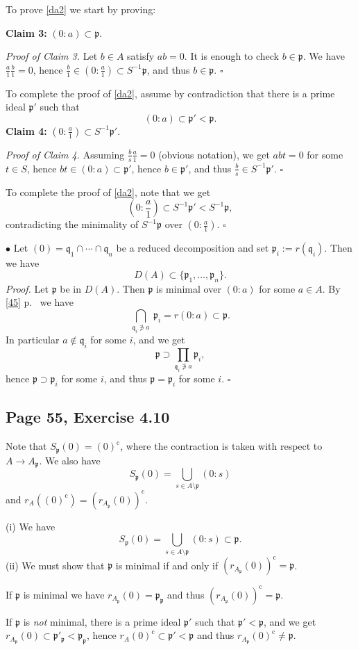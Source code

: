 \documentclass[parskip=half,fontsize=12pt]{scrartcl}%
\newcommand{\oo}{\operatorname}\newcommand{\ooo}{\operatorname*}
\newcommand{\mf}{\mathfrak}
\newcommand{\ppp}{\mf p}
\newcommand{\qqq}{\mf q}
\newcommand{\bu}{\bullet}
\begin{document}
To prove \eqref{da2} we start by proving:

\textbf{Claim 3:} $(0:a)\subset\ppp$.

\emph{Proof of Claim 3.} Let $b\in A$ satisfy $ab=0$. It is enough to check $b\in\ppp$. We have $\frac a1\frac b1=0$, hence $\frac b1\in(0:\frac a1)\subset S^{-1}\ppp$, and thus $b\in\ppp$. $\square$

To complete the proof of \eqref{da2}, assume by contradiction that there is a prime ideal $\ppp'$ such that 
$$
(0:a)\subset\ppp'<\ppp.
$$ 
\textbf{Claim 4:} $(0:\frac a1)\subset S^{-1}\ppp'$.

\emph{Proof of Claim 4.} Assuming $\frac bs\frac a1=0$ (obvious notation), we get $abt=0$ for some $t\in S$, hence $bt\in(0:a)\subset\ppp'$, hence $b\in\ppp'$, and thus $\frac bs\in S^{-1}\ppp'$. $\square$ 

To complete the proof of \eqref{da2}, note that we get 
$$
\left(0:\frac a1\right)\subset S^{-1}\ppp'<S^{-1}\ppp,
$$ 
contradicting the minimality of $S^{-1}\ppp$ over $(0:\frac a1)$. %
$\square$

$\bu$ Let $(0)=\qqq_1\cap\cdots\cap\qqq_n$ be a reduced decomposition and set $\ppp_i:=r(\qqq_i)$. Then we have 
$$
D(A)\subset\{\ppp_1,\dots,\ppp_n\}.
$$ 
\emph{Proof.} Let $\ppp$ be in $D(A)$. Then $\ppp$ is minimal over $(0:a)$ for some $a\in A$. By \eqref{45} p.~\pageref{45} we have 
$$
\bigcap_{\qqq_i\not\ni a}\ \ppp_i=r(0:a)\subset\ppp.
$$ 
In particular $a\notin\qqq_i$ for some $i$, and we get 
$$
\ppp\supset\prod_{\qqq_i\not\ni a}\ppp_i,
$$ 
hence $\ppp\supset\ppp_i$ for some $i$, and thus $\ppp=\ppp_i$ for some $i$. $\square$

\subsection{Page 55, Exercise 4.10}%

Note that $S_\ppp(0)=(0)^{\oo c}$, where the contraction is taken with respect to $A\to A_\ppp$. We also have 
$$
S_\ppp(0)=\bigcup_{s\in A\setminus\ppp}(0:s)
$$ 
and $r_A((0)^{\oo c})=(r_{A_\ppp}(0))^{\oo c}$.

(i) We have 
$$
S_\ppp(0)=\bigcup_{s\in A\setminus\ppp}(0:s)\subset\ppp.
$$
(ii) We must show that $\ppp$ is minimal if and only if $(r_{A_\ppp}(0))^{\oo c}=\ppp$. 

If $\ppp$ is minimal we have $r_{A_\ppp}(0)=\ppp_\ppp$ and thus $(r_{A_\ppp}(0))^{\oo c}=\ppp$. 

If $\ppp$ is \emph{not} minimal, there is a prime ideal $\ppp'$ such that $\ppp'<\ppp$, and we get $r_{A_\ppp}(0)\subset\ppp'_\ppp<\ppp_\ppp$, hence $r_A(0)^{\oo c}\subset\ppp'<\ppp$ and thus $r_{A_\ppp}(0)^{\oo c}\ne\ppp$.
\end{document}
